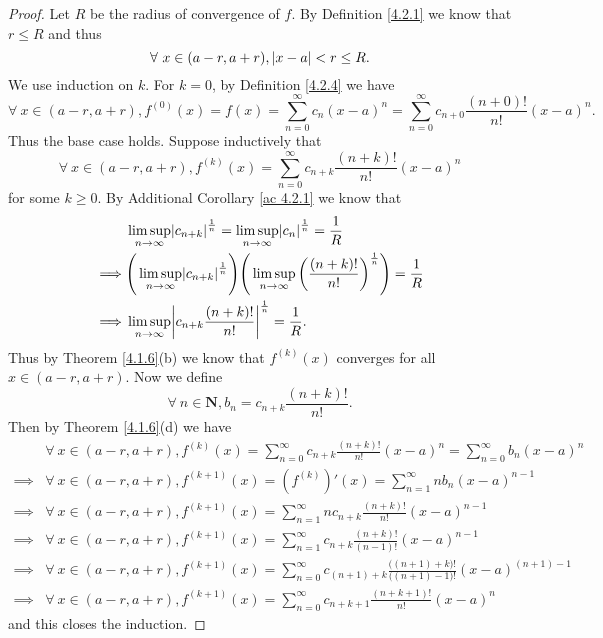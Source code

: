 \begin{proof}
    Let \(R\) be the radius of convergence of \(f\).
    By Definition \ref{4.2.1} we know that \(r \leq R\) and thus
    \[
        \forall\ x \in (a - r, a + r), \abs*{x - a} < r \leq R.
    \]
    We use induction on \(k\).
    For \(k = 0\), by Definition \ref{4.2.4} we have
    \[
        \forall\ x \in (a - r, a + r), f^{(0)}(x) = f(x) = \sum_{n = 0}^\infty c_n (x - a)^n = \sum_{n = 0}^\infty c_{n + 0} \frac{(n + 0)!}{n!} (x - a)^n.
    \]
    Thus the base case holds.
    Suppose inductively that
    \[
        \forall\ x \in (a - r, a + r), f^{(k)}(x) = \sum_{n = 0}^\infty c_{n + k} \frac{(n + k)!}{n!} (x - a)^n
    \]
    for some \(k \geq 0\).
    By Additional Corollary \ref{ac 4.2.1} we know that
    \begin{align*}
                 & \limsup_{n \to \infty} \abs*{c_{n + k}}^{\frac{1}{n}} = \limsup_{n \to \infty} \abs*{c_n}^{\frac{1}{n}} = \frac{1}{R}                                            \\
        \implies & \Bigg(\limsup_{n \to \infty} \abs*{c_{n + k}}^{\frac{1}{n}}\Bigg) \Bigg(\limsup_{n \to \infty} \bigg(\frac{(n + k)!}{n!}\bigg)^{\frac{1}{n}}\Bigg) = \frac{1}{R} \\
        \implies & \limsup_{n \to \infty} \abs*{c_{n + k} \frac{(n + k)!}{n!}}^{\frac{1}{n}} = \frac{1}{R}.
    \end{align*}
    Thus by Theorem \ref{4.1.6}(b) we know that \(f^{(k)}(x)\) converges for all \(x \in (a - r, a + r)\).
    Now we define
    \[
        \forall\ n \in \mathbf{N}, b_n = c_{n + k} \frac{(n + k)!}{n!}.
    \]
    Then by Theorem \ref{4.1.6}(d) we have
    \begin{align*}
                 & \forall\ x \in (a - r, a + r), f^{(k)}(x) = \sum_{n = 0}^\infty c_{n + k} \frac{(n + k)!}{n!} (x - a)^n = \sum_{n = 0}^\infty b_n (x - a)^n                     \\
        \implies & \forall\ x \in (a - r, a + r), f^{(k + 1)}(x) = (f^{(k)})'(x) = \sum_{n = 1}^\infty n b_n (x - a)^{n - 1}                                                       \\
        \implies & \forall\ x \in (a - r, a + r), f^{(k + 1)}(x) = \sum_{n = 1}^\infty n c_{n + k} \frac{(n + k)!}{n!} (x - a)^{n - 1}                                             \\
        \implies & \forall\ x \in (a - r, a + r), f^{(k + 1)}(x) = \sum_{n = 1}^\infty c_{n + k} \frac{(n + k)!}{(n - 1)!} (x - a)^{n - 1}                                         \\
        \implies & \forall\ x \in (a - r, a + r), f^{(k + 1)}(x) = \sum_{n = 0}^\infty c_{(n + 1) + k} \frac{\big((n + 1) + k\big)!}{\big((n + 1) - 1\big)!} (x - a)^{(n + 1) - 1} \\
        \implies & \forall\ x \in (a - r, a + r), f^{(k + 1)}(x) = \sum_{n = 0}^\infty c_{n + k + 1} \frac{(n + k + 1)!}{n!} (x - a)^n
    \end{align*}
    and this closes the induction.
\end{proof}

